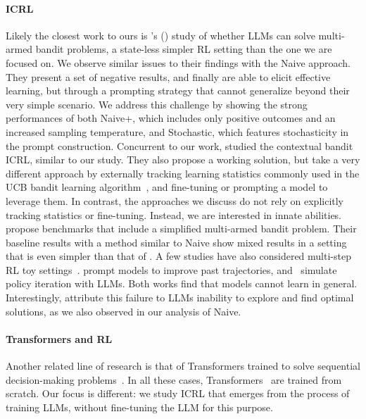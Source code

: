 \documentclass{article}
\theoremstyle{plain}
\theoremstyle{definition}
\theoremstyle{remark}
\newcommand{\naiveshort}{Naive\xspace}
\newcommand{\naiveplusshort}{Naive+\xspace}
\newcommand{\expshort}{Stochastic\xspace}
\begin{document}
\paragraph{ICRL}
Likely the closest work to ours is \citeauthor{krishnamurthy2024largelanguagemodelsexplore}'s (\citeyear{krishnamurthy2024largelanguagemodelsexplore}) study of whether LLMs can solve multi-armed bandit problems, a state-less simpler RL setting than the one we are focused on.
We observe similar issues to their findings with the \naiveshort approach.
They present a set of negative results, and finally are able to elicit effective learning, but through a prompting strategy that cannot generalize beyond their very simple scenario.
We address this challenge by showing the strong performances of both \naiveplusshort, which includes only positive outcomes and an increased sampling temperature, and \expshort, which features stochasticity in the prompt construction.
Concurrent to our work, \citet{nie2024evolve} studied the contextual bandit ICRL, similar to our study. They also propose a working solution, but take a very different approach by externally tracking learning statistics commonly used in the UCB bandit learning algorithm~\citep{Auer2002}, and fine-tuning or prompting a model to leverage them.
In contrast, the approaches we discuss do not rely on explicitly tracking statistics or fine-tuning. Instead, we are interested in innate abilities.
\citet{wu2024smartplaybenchmarkllmsintelligent} propose benchmarks that include a simplified multi-armed bandit problem. Their baseline results with a method similar to \naiveshort show mixed results in a setting that is even simpler than that of \citet{krishnamurthy2024largelanguagemodelsexplore}.
A few studies have also considered multi-step RL toy settings~\citep{NEURIPS2023_60dc7fa8, mirchandani2023large}. \citet{mirchandani2023large} prompt models to improve past trajectories, and~\citet{NEURIPS2023_60dc7fa8} simulate policy iteration with LLMs.
Both works find that models cannot learn in general. Interestingly, \citet{mirchandani2023large} attribute this failure to LLMs inability to explore and find optimal solutions, as we also observed in our analysis of \naiveshort.
\paragraph{Transformers and RL}
Another related line of research is that of Transformers trained to solve sequential decision-making problems~\citep{janner2021sequence, chen2021decision, pmlr-v162-xu22g,laskin2022incontextreinforcementlearningalgorithm, pmlr-v162-zheng22c, NEURIPS2023_8644b61a, grigsby2023amago, raparthy2023generalizationnewsequentialdecision}. In all these cases, Transformers~\citep{vaswani2017attention} are trained from scratch. Our focus is different: we study ICRL that emerges from the process of training LLMs, without fine-tuning the LLM for this purpose.
\end{document}
